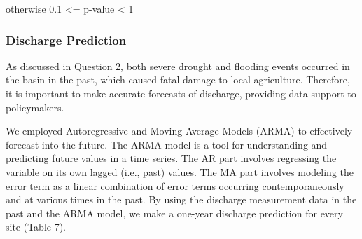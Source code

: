 \documentclass[12pt,]{article}
\begin{document}
otherwise 0.1 \textless{}= p-value \textless{} 1

\hypertarget{discharge-prediction}{%
\subsubsection{Discharge Prediction}\label{discharge-prediction}}

As discussed in Question 2, both severe drought and flooding events
occurred in the basin in the past, which caused fatal damage to local
agriculture. Therefore, it is important to make accurate forecasts of
discharge, providing data support to policymakers.

We employed Autoregressive and Moving Average Models (ARMA) to
effectively forecast into the future. The ARMA model is a tool for
understanding and predicting future values in a time series. The AR part
involves regressing the variable on its own lagged (i.e., past) values.
The MA part involves modeling the error term as a linear combination of
error terms occurring contemporaneously and at various times in the
past. By using the discharge measurement data in the past and the ARMA
model, we make a one-year discharge prediction for every site (Table 7).
\end{document}
